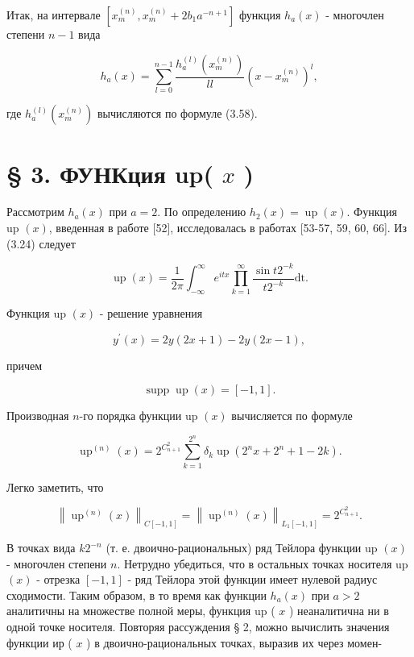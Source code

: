 \documentclass[10pt]{article}
\begin{document}
Итак, на интервале $\left[x_{m}^{(n)}, x_{m}^{(n)}+2 b_{1} a^{-n+1}\right]$ функция $h_{a}(x)$ - многочлен степени $n-1$ вида


\begin{equation*}
h_{a}(x)=\sum_{l=0}^{n-1} \frac{h_{a}^{(l)}\left(x_{m}^{(n)}\right)}{l l}\left(x-x_{m}^{(n)}\right)^{l}, \tag{3.59}
\end{equation*}


где $h_{a}^{(l)}\left(x_{m}^{(n)}\right)$ вычисляются по формуле (3.58).

\section*{§ 3. ФУНКция up( $x$ )}
Рассмотрим $h_{a}(x)$ при $a=2$. По определению $h_{2}(x)=\operatorname{up}(x)$. Функция up $(x)$, введенная в работе [52], исследовалась в работах [53-57, 59, 60, 66]. Из (3.24) следует


\begin{equation*}
\operatorname{up}(x)=\frac{1}{2 \pi} \int_{-\infty}^{\infty} e^{i t x} \prod_{k=1}^{\infty} \frac{\sin t 2^{-k}}{t 2^{-k}} \mathrm{dt} . \tag{3.60}
\end{equation*}


Функция up $(x)$ - решение уравнения


\begin{equation*}
y^{\prime}(x)=2 y(2 x+1)-2 y(2 x-1), \tag{3.61}
\end{equation*}


причем


\begin{equation*}
\operatorname{supp} \operatorname{up}(x)=[-1,1] . \tag{3.62}
\end{equation*}


Производная $n$-го порядка функции up $(x)$ вычисляется по формуле


\begin{equation*}
\operatorname{up}^{(n)}(x)=2^{C_{n+1}^{2}} \sum_{k=1}^{2^{n}} \delta_{k} \operatorname{up}\left(2^{n} x+2^{n}+1-2 k\right) . \tag{3.63}
\end{equation*}


Легко заметить, что


\begin{equation*}
\left\|\operatorname{up}^{(n)}(x)\right\|_{C[-1,1]}=\left\|\operatorname{up}^{(n)}(x)\right\|_{L_{1}[-1,1]}=2^{C_{n+1}^{2}} . \tag{3.64}
\end{equation*}


В точках вида $k 2^{-n}$ (т. е. двоично-рациональных) ряд Тейлора функции up $(x)$ - многочлен степени $n$. Нетрудно убедиться, что в остальных точках носителя up $(x)$ - отрезка $[-1,1]$ - ряд Тейлора этой функции имеет нулевой радиус сходимости. Таким образом, в то время как функции $h_{a}(x)$ при $a>2$ аналитичны на множестве полной меры, функция up ( $x$ ) неаналитична ни в одной точке носителя. Повторяя рассуждения § 2, можно вычислить значения функции ир ( $x$ ) в двоично-рациональных точках, выразив их через момен-
\end{document}
